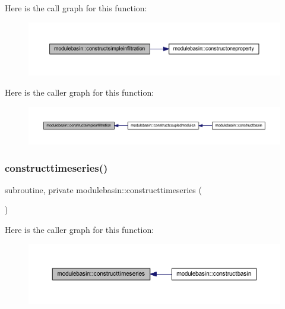 Here is the call graph for this function\+:\nopagebreak
\begin{figure}[H]
\begin{center}
\leavevmode
\includegraphics[width=350pt]{namespacemodulebasin_a0b7274cf3bbde399251125f839f59767_cgraph}
\end{center}
\end{figure}
Here is the caller graph for this function\+:\nopagebreak
\begin{figure}[H]
\begin{center}
\leavevmode
\includegraphics[width=350pt]{namespacemodulebasin_a0b7274cf3bbde399251125f839f59767_icgraph}
\end{center}
\end{figure}
\mbox{\label{namespacemodulebasin_a485c76ff915dee4b9ba1ca5c7e79d462}} 
\subsubsection{\texorpdfstring{constructtimeseries()}{constructtimeseries()}}
{\footnotesize\ttfamily subroutine, private modulebasin\+::constructtimeseries (\begin{DoxyParamCaption}{ }\end{DoxyParamCaption})\hspace{0.3cm}{\ttfamily [private]}}

Here is the caller graph for this function\+:\nopagebreak
\begin{figure}[H]
\begin{center}
\leavevmode
\includegraphics[width=350pt]{namespacemodulebasin_a485c76ff915dee4b9ba1ca5c7e79d462_icgraph}
\end{center}
\end{figure}
\mbox{\label{namespacemodulebasin_a1aae2d1fbf8f2ccffa519261e67515b3}} 
